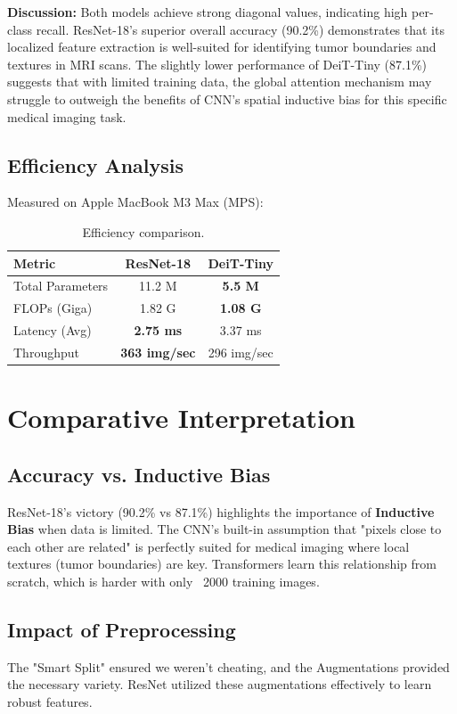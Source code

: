 \documentclass[12pt, a4paper]{article}
\begin{document}
\textbf{Discussion:} Both models achieve strong diagonal values, indicating high per-class recall. ResNet-18's superior overall accuracy (90.2\%) demonstrates that its localized feature extraction is well-suited for identifying tumor boundaries and textures in MRI scans. The slightly lower performance of DeiT-Tiny (87.1\%) suggests that with limited training data, the global attention mechanism may struggle to outweigh the benefits of CNN's spatial inductive bias for this specific medical imaging task.

\subsection{Efficiency Analysis}
Measured on Apple MacBook M3 Max (MPS):

\begin{table}[H]
\centering
\begin{tabular}{lcc}
\toprule
\textbf{Metric} & \textbf{ResNet-18} & \textbf{DeiT-Tiny} \\
\midrule
Total Parameters & 11.2 M & \textbf{5.5 M} \\
FLOPs (Giga) & 1.82 G & \textbf{1.08 G} \\
Latency (Avg) & \textbf{2.75 ms} & 3.37 ms \\
Throughput & \textbf{363 img/sec} & 296 img/sec \\
\bottomrule
\end{tabular}
\caption{Efficiency comparison.}
\label{tab:efficiency}
\end{table}

\section{Comparative Interpretation}

\subsection{Accuracy vs. Inductive Bias}
ResNet-18's victory (90.2\% vs 87.1\%) highlights the importance of \textbf{Inductive Bias} when data is limited. The CNN's built-in assumption that "pixels close to each other are related" is perfectly suited for medical imaging where local textures (tumor boundaries) are key. Transformers learn this relationship from scratch, which is harder with only ~2000 training images.

\subsection{Impact of Preprocessing}
The "Smart Split" ensured we weren't cheating, and the Augmentations provided the necessary variety. ResNet utilized these augmentations effectively to learn robust features.
\end{document}
